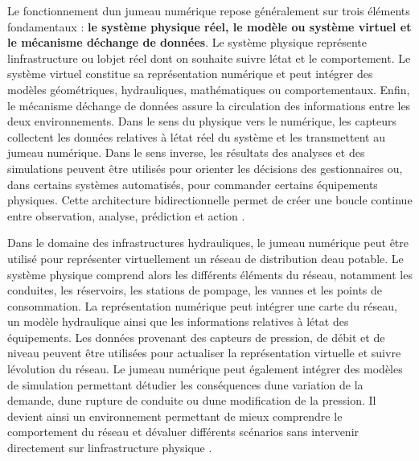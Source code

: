 \documentclass[12pt,a4paper,oneside]{report}
\begin{document}
Le fonctionnement d\textquotesingle un jumeau numérique repose
généralement sur trois éléments fondamentaux : \textbf{le système
physique réel, le modèle ou système virtuel et le mécanisme
d\textquotesingle échange de données}. Le système physique représente
l\textquotesingle infrastructure ou l\textquotesingle objet réel dont on
souhaite suivre l\textquotesingle état et le comportement. Le système
virtuel constitue sa représentation numérique et peut intégrer des
modèles géométriques, hydrauliques, mathématiques ou comportementaux.
Enfin, le mécanisme d\textquotesingle échange de données assure la
circulation des informations entre les deux environnements. Dans le sens
du physique vers le numérique, les capteurs collectent les données
relatives à l\textquotesingle état réel du système et les transmettent
au jumeau numérique. Dans le sens inverse, les résultats des analyses et
des simulations peuvent être utilisés pour orienter les décisions des
gestionnaires ou, dans certains systèmes automatisés, pour commander
certains équipements physiques. Cette architecture bidirectionnelle
permet de créer une boucle continue entre observation, analyse,
prédiction et action \cite{ref60}.

Dans le domaine des infrastructures hydrauliques, le jumeau numérique
peut être utilisé pour représenter virtuellement un réseau de
distribution d\textquotesingle eau potable. Le système physique comprend
alors les différents éléments du réseau, notamment les conduites, les
réservoirs, les stations de pompage, les vannes et les points de
consommation. La représentation numérique peut intégrer une carte du
réseau, un modèle hydraulique ainsi que les informations relatives à
l\textquotesingle état des équipements. Les données provenant des
capteurs de pression, de débit et de niveau peuvent être utilisées pour
actualiser la représentation virtuelle et suivre
l\textquotesingle évolution du réseau. Le jumeau numérique peut
également intégrer des modèles de simulation permettant
d\textquotesingle étudier les conséquences d\textquotesingle une
variation de la demande, d\textquotesingle une rupture de conduite ou
d\textquotesingle une modification de la pression. Il devient ainsi un
environnement permettant de mieux comprendre le comportement du réseau
et d\textquotesingle évaluer différents scénarios sans intervenir
directement sur l\textquotesingle infrastructure physique \cite{ref20}.
\end{document}
